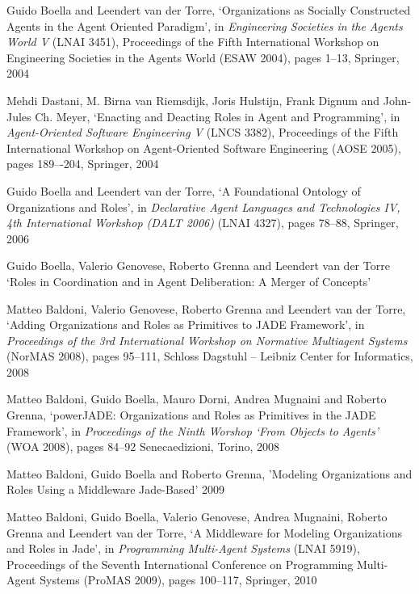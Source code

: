 \begin{thebibliography}{99}

Guido Boella and Leendert van der Torre,
`Organizations as Socially Constructed Agents in the Agent Oriented Paradigm',
in \textit{Engineering Societies in the Agents World V} (LNAI 3451),
Proceedings of the Fifth International Workshop on Engineering Societies in the Agents World (ESAW 2004),
pages 1--13,
Springer, 2004

Mehdi Dastani, M. Birna van Riemsdijk, Joris Hulstijn, Frank Dignum and John-Jules Ch. Meyer,
`Enacting and Deacting Roles in Agent and Programming',
in \textit{Agent-Oriented Software Engineering V} (LNCS 3382),
Proceedings of the Fifth International Workshop on Agent-Oriented Software Engineering (AOSE 2005),
pages 189–-204,
Springer, 2004

Guido Boella and Leendert van der Torre,
`A Foundational Ontology of Organizations and Roles',
in \textit{Declarative Agent Languages and Technologies IV, 4th International Workshop (DALT 2006)} (LNAI 4327),
pages 78--88,
Springer, 2006

Guido Boella, Valerio Genovese, Roberto Grenna and Leendert van der Torre
`Roles in Coordination and in Agent Deliberation: A Merger of Concepts'


Matteo Baldoni, Valerio Genovese, Roberto Grenna and Leendert van der Torre,
`Adding Organizations and Roles as Primitives to JADE Framework',
in \textit{Proceedings of the 3rd International Workshop on Normative Multiagent Systems} (NorMAS 2008),
pages 95--111,
Schloss Dagstuhl -- Leibniz Center for Informatics, 2008

Matteo Baldoni, Guido Boella, Mauro Dorni, Andrea Mugnaini and Roberto Grenna,
`powerJADE: Organizations and Roles as Primitives in the JADE Framework',
in \textit{Proceedings of the Ninth Worshop `From Objects to Agents'} (WOA 2008),
pages 84--92
Senecaedizioni, Torino, 2008

Matteo Baldoni, Guido Boella and Roberto Grenna,
'Modeling Organizations and Roles Using a Middleware Jade-Based'
2009

Matteo Baldoni, Guido Boella, Valerio Genovese, Andrea Mugnaini, Roberto Grenna and Leendert van der Torre,
`A Middleware for Modeling Organizations and Roles in Jade',
in \textit{Programming Multi-Agent Systems} (LNAI 5919),
Proceedings of the Seventh International Conference on Programming Multi-Agent Systems (ProMAS 2009),
pages 100--117, 
Springer, 2010


\end{thebibliography}
